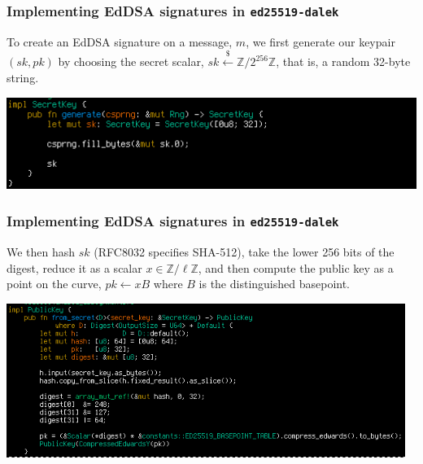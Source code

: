 \documentclass[xetex,aspectratio=169]{beamer}
\newcommand{\ZZ}{\mathbb{Z}}
\newcommand{\uniformsample}{\xleftarrow\$}
\begin{document}
  
  \begin{frame}
    \frametitle{Implementing EdDSA signatures in \texttt{ed25519-dalek}}

    To create an EdDSA signature on a message, $m$, we first generate
    our keypair $(sk, pk)$ by choosing the secret scalar,
    $sk \uniformsample \ZZ / 2^{256}\ZZ$, that is, a random 32-byte
    string. \pause

    \begin{center}
      \includegraphics[height=3cm]{keygen-secret.png}
    \end{center}
  \end{frame}

  \begin{frame}
    \frametitle{Implementing EdDSA signatures in \texttt{ed25519-dalek}}

    We then hash $sk$ (RFC8032 specifies SHA-512), take the lower 256
    bits of the digest, reduce it as a scalar $x \in \ZZ / \ell\ZZ$,
    and then compute the public key as a point on the curve,
    $pk \gets x B$ where $B$ is the distinguished basepoint. \pause

    \begin{center}
      \includegraphics[height=5cm]{keygen-public.png}
    \end{center}
  \end{frame}
\end{document}
